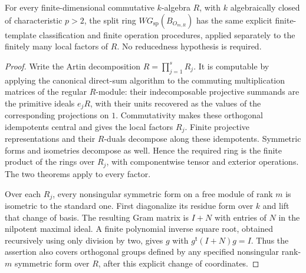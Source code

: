 \begin{corollary}
\label{C:finite_algclosed_algebra_WG}
For every finite-dimensional commutative $k$-algebra $R$, with $k$
algebraically closed of characteristic $p>2$, the split ring
$WG_{\mathrm{sp}}(B_{O_{m,R}})$ has the same explicit finite-template
classification and finite operation procedures, applied separately to
the finitely many local factors of $R$. No reducedness hypothesis is
required.
\end{corollary}
\begin{proof}
Write the Artin decomposition $R=\prod_{j=1}^sR_j$. It is computable by
applying the canonical direct-sum algorithm to the commuting multiplication
matrices of the regular $R$-module: their indecomposable projective summands
are the primitive ideals $e_jR$, with their units recovered as the values
of the corresponding projections on $1$. Commutativity makes these
orthogonal idempotents central and gives the local factors $R_j$.
Finite projective representations and their $R$-duals decompose along
these idempotents. Symmetric forms and isometries decompose as well.
Hence the required ring is the finite product of the rings over $R_j$,
with componentwise tensor and exterior operations. The two theorems apply
to every factor.

Over each $R_j$, every nonsingular symmetric form on a free module of
rank $m$ is isometric to the standard one. First diagonalize its residue
form over $k$ and lift that change of basis. The resulting Gram matrix is
$I+N$ with entries of $N$ in the nilpotent maximal ideal. A finite polynomial
inverse square root, obtained recursively using only division by two,
gives $g$ with $g^{\mathsf t}(I+N)g=I$. Thus the assertion also covers
orthogonal groups defined by any specified nonsingular rank-$m$ symmetric
form over $R$, after this explicit change of coordinates.
\end{proof}

